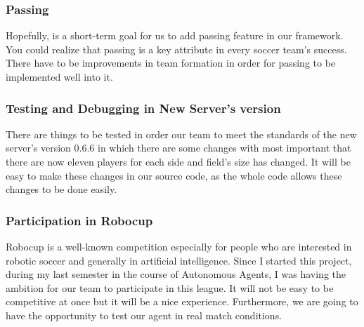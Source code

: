 \subsubsection*{Passing}
Hopefully, is a short-term goal for us to add passing feature in our framework. You could realize that passing is a key attribute in every soccer team's success. There have to be improvements in team formation in order for passing to be implemented well into it.


\subsubsection*{Testing and Debugging in New Server's version}
There are things to be tested in order our team to meet the standards of the new server's version 0.6.6 in which there are some changes with most important that there are now eleven players for each side and field's size has changed. It will be easy to make these changes in our source code, as the whole code allows these changes to be done easily.


\subsubsection*{Participation in Robocup}
Robocup is a well-known competition especially for people who are interested in robotic soccer and generally in artificial intelligence. Since I started this project, during my last semester in the course of Autonomous Agents, I was having the ambition for our team to participate in this league. It will not be easy to be competitive at once but it will be a nice experience. Furthermore, we are going to have the opportunity to test our agent in real match conditions.
 


